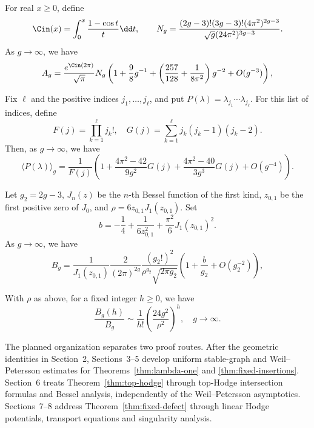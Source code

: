 \begin{thm}
\label{thm:lambda-one}
For real $x\geq0$, define
\[\Cin(x)=\int_0^x \frac{1-\cos t}{t}\dd t, \qquad
N_g=\frac{(2g-3)!(3g-3)!(4\pi^2)^{2g-3}}{\sqrt{g}(24\pi^2)^{3g-3}}.\]
As $g\to \infty$, we have
\begin{equation}
A_g=\frac{e^{\Cin(2\pi)}}{\sqrt{\pi}}N_g
\left(1+\frac{9}{8}g^{-1}+\left(\frac{257}{128}+\frac{1}{8\pi^2}\right)g^{-2}+O(g^{-3})\right),
\label{eq:111}
\end{equation}
\end{thm}

\begin{thm}
\label{thm:fixed-insertions}
Fix $\ell$ and the positive indices $j_1,\ldots,j_\ell$, and put
$P(\lambda)=\lambda_{j_1}\cdots\lambda_{j_\ell}$.  For this list of
indices, define
\[F(j)=\prod_{k=1}^\ell j_k!, \quad G(j)=\sum_{k=1}^\ell j_k(j_k-1)(j_k-2).\]
Then, as $g\to\infty$, we have
\begin{equation}
\langle P(\lambda) \rangle_g=\frac{1}{F(j)}\left(1+\frac{4\pi^2-42}{9g^2}G(j)+
\frac{4\pi^2-40}{3g^3}G(j)+O(g^{-4})\right).
\label{eq:P111}
\end{equation}
\end{thm}

\begin{thm}
\label{thm:top-hodge}
Let $g_2=2g-3$, $J_n(z)$ be the $n$-th Bessel function of the first kind, $z_{0,1}$ be the first
positive zero of $J_0$, and $\rho=6z_{0,1}J_1(z_{0,1})$.
Set
\[b=-\frac{1}{4}+\frac{1}{6z_{0,1}^2}+\frac{\pi^2}{6}J_1(z_{0,1})^2.\]
As $g\to\infty$, we have
\begin{equation}
B_g=\frac{1}{J_1(z_{0,1})}\frac{2}{(2\pi)^{2g}}\frac{(g_2!)^2}{\rho^{g_2}\sqrt{2\pi g_2}}\left(
1+\frac{b}{g_2}+O(g_2^{-2})\right),
\label{eq:g111}
\end{equation}
\end{thm}

\begin{thm}
\label{thm:fixed-defect}
With $\rho$ as above, for a fixed integer $h\geq0$, we have
\begin{equation}
\frac{B_g(h)}{B_g}\sim \frac{1}{h!}\left(\frac{24g^2}{\rho^2}\right)^h,\quad g\to\infty.
\label{eq:gh11}
\end{equation}
\end{thm}

The planned organization separates two proof routes.  After the geometric
identities in Section~2, Sections~3--5 develop uniform stable-graph and
Weil--Petersson estimates for Theorems~\ref{thm:lambda-one} and
\ref{thm:fixed-insertions}.  Section~6 treats
Theorem~\ref{thm:top-hodge} through top-Hodge intersection formulas
and Bessel analysis, independently of the Weil--Petersson asymptotics.
Sections~7--8 address Theorem~\ref{thm:fixed-defect} through linear
Hodge potentials, transport equations and singularity analysis.
